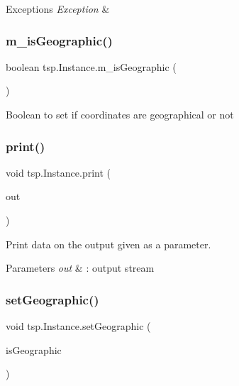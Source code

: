 \begin{DoxyExceptions}{Exceptions}
{\em Exception} & \\
\hline
\end{DoxyExceptions}
\mbox{\label{classtsp_1_1_instance_a38f72c0ba953f2a70571d47233b62c69}} 
\subsubsection{\texorpdfstring{m\+\_\+is\+Geographic()}{m\_isGeographic()}}
{\footnotesize\ttfamily boolean tsp.\+Instance.\+m\+\_\+is\+Geographic (\begin{DoxyParamCaption}{ }\end{DoxyParamCaption})\hspace{0.3cm}{\ttfamily [inline]}}

Boolean to set if coordinates are geographical or not \mbox{\label{classtsp_1_1_instance_af3fac8f6b1104d6cbfaa15228aaa6e71}} 
\subsubsection{\texorpdfstring{print()}{print()}}
{\footnotesize\ttfamily void tsp.\+Instance.\+print (\begin{DoxyParamCaption}\item[{Print\+Stream}]{out }\end{DoxyParamCaption})\hspace{0.3cm}{\ttfamily [inline]}}

Print data on the output given as a parameter.


\begin{DoxyParams}{Parameters}
{\em out} & \+: output stream \\
\hline
\end{DoxyParams}
\mbox{\label{classtsp_1_1_instance_a72144d15fab405a9069aa9af271959e1}} 
\subsubsection{\texorpdfstring{set\+Geographic()}{setGeographic()}}
{\footnotesize\ttfamily void tsp.\+Instance.\+set\+Geographic (\begin{DoxyParamCaption}\item[{boolean}]{is\+Geographic }\end{DoxyParamCaption})\hspace{0.3cm}{\ttfamily [inline]}}

